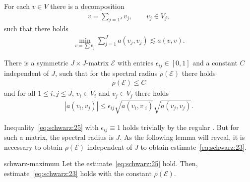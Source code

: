 \begin{assumption}
  \label{assumption:schwarz:stable-decomposition}
  For each $v\in V$ there is a decomposition
  \begin{gather*}
    v = \sum_{j=1^J} v_j, \qquad v_j\in V_j,
  \end{gather*}
  such that there holds
  \begin{gather}
    \label{eq:schwarz:24}
     \min_{v=\sum v_j}\sum_{j=1}^J a(v_j, v_j) \lesssim a(v,v).
  \end{gather}  
\end{assumption}

\begin{assumption}
  \label{assumption:schwarz:1}
   There is a symmetric $J\times J$-matrix
  $\mathcal E$ with entries $\epsilon_{ij} \in [0,1]$ and a constant
  $C$ independent of $J$, such that for the spectral radius
  $\rho(\mathcal E)$ there holds
  \begin{gather*}
    \rho(\mathcal E) \le C
  \end{gather*}
  and for all $1 \le i,j \le J$, $v_i \in V_i$ and $v_j \in V_j$ there
  holds
  \begin{gather}
    \label{eq:schwarz:25}
    \left| a(v_i, v_j)\right|
    \le \epsilon_{ij} \sqrt{a(v_i,v_{\phantom ji})} \sqrt{a(v_j,v_j)}.
  \end{gather}
\end{assumption}

\begin{remark}
  Inequality~\eqref{eq:schwarz:25} with $\epsilon_{ij} \equiv 1$ holds
  trivially by the regular .  But for such a matrix, the spectral radius is
  $J$. As the following lemma will reveal, it is necessary to obtain
  $\rho(\mathcal E)$ independent of $J$ to obtain
  estimate~\eqref{eq:schwarz:23}.
\end{remark}

\begin{Lemma}{schwarz-maximum}
  \label{lemma:schwarz:7}
  Let the estimate~\eqref{eq:schwarz:25} hold. Then,
  estimate~\eqref{eq:schwarz:23} holds with the constant
  $\rho(\mathcal E)$.
\end{Lemma}

